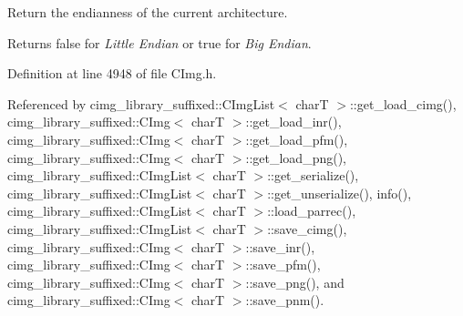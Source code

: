 Return the endianness of the current architecture. 

\begin{DoxyReturn}{Returns}
{\ttfamily false} for {\itshape Little Endian} or {\ttfamily true} for {\itshape Big Endian}. 
\end{DoxyReturn}


Definition at line 4948 of file C\+Img.\+h.



Referenced by cimg\+\_\+library\+\_\+suffixed\+::\+C\+Img\+List$<$ char\+T $>$\+::get\+\_\+load\+\_\+cimg(), cimg\+\_\+library\+\_\+suffixed\+::\+C\+Img$<$ char\+T $>$\+::get\+\_\+load\+\_\+inr(), cimg\+\_\+library\+\_\+suffixed\+::\+C\+Img$<$ char\+T $>$\+::get\+\_\+load\+\_\+pfm(), cimg\+\_\+library\+\_\+suffixed\+::\+C\+Img$<$ char\+T $>$\+::get\+\_\+load\+\_\+png(), cimg\+\_\+library\+\_\+suffixed\+::\+C\+Img\+List$<$ char\+T $>$\+::get\+\_\+serialize(), cimg\+\_\+library\+\_\+suffixed\+::\+C\+Img\+List$<$ char\+T $>$\+::get\+\_\+unserialize(), info(), cimg\+\_\+library\+\_\+suffixed\+::\+C\+Img\+List$<$ char\+T $>$\+::load\+\_\+parrec(), cimg\+\_\+library\+\_\+suffixed\+::\+C\+Img\+List$<$ char\+T $>$\+::save\+\_\+cimg(), cimg\+\_\+library\+\_\+suffixed\+::\+C\+Img$<$ char\+T $>$\+::save\+\_\+inr(), cimg\+\_\+library\+\_\+suffixed\+::\+C\+Img$<$ char\+T $>$\+::save\+\_\+pfm(), cimg\+\_\+library\+\_\+suffixed\+::\+C\+Img$<$ char\+T $>$\+::save\+\_\+png(), and cimg\+\_\+library\+\_\+suffixed\+::\+C\+Img$<$ char\+T $>$\+::save\+\_\+pnm().

